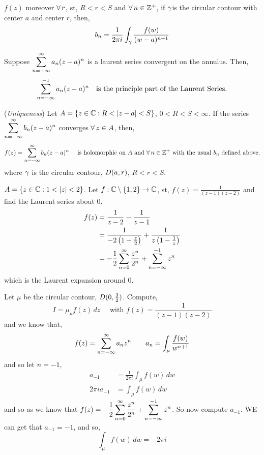 \documentclass{article}
\begin{document}
\noindent
$f(z)$ moreover $\forall\, r$, st, $R < r < S$ and $\forall\, n\in\mathbb{Z}^+$, if $\gamma$is the circular contour with center $a$ and center $r$, then,
$$ b_n = \frac{1}{2\pi i}\int_\gamma {\frac{f(w)}{(w - a)^{n + 1}}} $$

\noindent
Suppose $\displaystyle{\sum_{n = -\infty}^{\infty}a_n(z - a)^{n}}$ is a laurent series convergent on the annulus. Then,
$$ \sum_{n = -\infty}^{-1} a_n(z - a)^n \quad \text{is the principle part of the Laurent Series.} $$

\begin{nthm}{(\textit{Uniqueness})}
  Let $A = \{ z\in\mathbb{C} : R < |z - a| < S\}$, $0 < R< S < \infty$. If the series $\displaystyle{\sum_{n = -\infty}^{\infty}b_n(z - a)^n}$ converges $\forall\, z\in A$, then,
  $$ f(z) = \sum_{n = -\infty}^{\infty} b_n(z - a)^n \quad \text{ is holomorphic on $A$ and $\forall\, n\in\mathbb{Z}^+$ with the usual $b_n$ defined above.} $$
  where $\gamma$ is the circular contour, $D(a, r)$, $R< r < S$.
\end{nthm}

\begin{eg}
  $A = \{z\in\mathbb{C} : 1 < |z| < 2\}$. Let $f : \mathbb{C}\setminus\{1, 2\} \to \mathbb{C}$, st, $\displaystyle{f(z) = \frac{1}{(z-1)(z-2)}}$ and find the Laurent series about 0.\\

  \begin{align*}
    f(z) &= \frac{1}{z - 2} - \frac{1}{z-1}\\
    &= \frac{1}{-2\left(1 - \frac{z}{2}\right)} + \frac{1}{z\left(1 - \frac{1}{z}\right)}\\
    &= -\frac{1}{2}\sum_{n=0}^\infty\frac{z^n}{2^n} + \sum_{n = -\infty}^{-1} z^n
  \end{align*}
  which is the Laurent expansion around $0$.
\end{eg}

\begin{eg}
  Let $\mu$ be the circular contour, $D(0, \frac{3}{2})$. Compute,
  $$ I = \mu_\mu f(z)\,dz \quad \text{ with } f(z) = \frac{1}{(z-1)(z-2)}$$
  and we know that,
  $$ f(z) = \sum_{n = -\infty}^{\infty} a_nz^n \qquad a_n = \int_\mu {\frac{f(w)}{w^{n+1}}} $$
  and so let $n = -1$,
  \begin{align*}
    a_{-1} &= \frac{1}{2\pi i}\int_\mu {f(w)}\,dw\\
    2\pi i a_{-1} &= \int_\mu f(w)\,dw
  \end{align*}
  and so as we know that $\displaystyle{f(z) = -\frac{1}{2}\sum_{n=0}^\infty\frac{z^n}{2^n} + \sum_{n = -\infty}^{-1}z^n}$. So now compute $a_{-1}$. WE can get that $a_{-1} = -1$, and so,
  $$ \int_\mu f(w)\,dw = -2\pi i $$
\end{eg}
\end{document}
